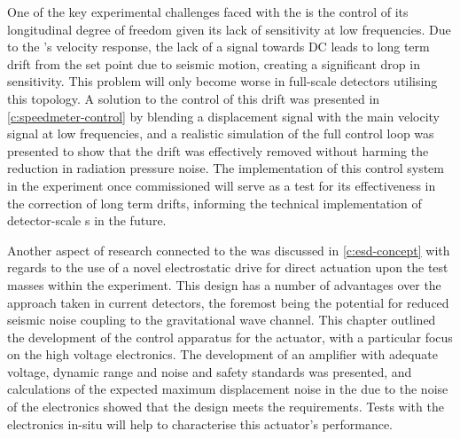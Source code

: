 One of the key experimental challenges faced with the \SSM{} is the control of its longitudinal degree of freedom given its lack of sensitivity at low frequencies. Due to the \SM{}'s velocity response, the lack of a signal towards \gls{DC} leads to long term drift from the set point due to seismic motion, creating a significant drop in sensitivity. This problem will only become worse in full-scale detectors utilising this topology. A solution to the control of this drift was presented in \cref{c:speedmeter-control} by blending a displacement signal with the main velocity signal at low frequencies, and a realistic simulation of the full control loop was presented to show that the drift was effectively removed without harming the reduction in radiation pressure noise. The implementation of this control system in the experiment once commissioned will serve as a test for its effectiveness in the correction of long term drifts, informing the technical implementation of detector-scale \SM{}s in the future.

Another aspect of research connected to the \SSM{} was discussed in \cref{c:esd-concept} with regards to the use of a novel electrostatic drive for direct actuation upon the test masses within the experiment. This design has a number of advantages over the approach taken in current detectors, the foremost being the potential for reduced seismic noise coupling to the gravitational wave channel. This chapter outlined the development of the control apparatus for the actuator, with a particular focus on the high voltage electronics. The development of an amplifier with adequate voltage, dynamic range and noise and safety standards was presented, and calculations of the expected maximum displacement noise in the \SSMEXPT{} due to the noise of the electronics showed that the design meets the requirements. Tests with the electronics in-situ will help to characterise this actuator's performance.

